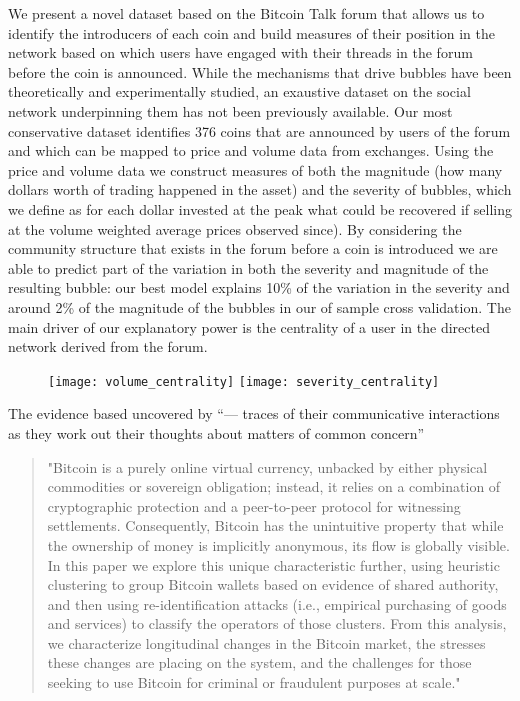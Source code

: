 We present a novel dataset based on the Bitcoin Talk forum that allows us to identify the introducers of each coin and build measures of their position in the network based on which users have engaged with their threads in the forum before the coin is announced.
While the mechanisms that drive bubbles have been theoretically  \cite{abolafia1988enacting, earl2007decision, bakker2010social, harras2011grow} and experimentally \cite{moinas2013bubble} studied, an exaustive dataset on the social network underpinning them has not been previously available.
Our most conservative dataset identifies 376 coins that are announced by users of the forum and which can be mapped to price and volume data from exchanges.
Using the price and volume data we construct measures of both  the magnitude (how many dollars worth of trading happened in the asset) and the severity of bubbles, which we define as for each dollar invested at the peak what could be recovered if selling at the volume weighted average prices observed since).
By considering the community structure that exists in the forum before a coin is introduced we are able to predict part of the variation in both the severity and magnitude of the resulting bubble: our best model explains 10\% of the variation in the severity and around 2\% of the magnitude of the bubbles in our of sample cross validation. 
The main driver of our explanatory power is the centrality of a user in the directed network derived from the forum.
\begin{figure}[b]
\texttt{[image: volume\_centrality]}
\texttt{[image: severity\_centrality]}
\end{figure}

The evidence based uncovered by “— traces of their communicative interactions as they work out their thoughts about matters of common concern” 

\begin{quote}
"Bitcoin is a purely online virtual currency, unbacked by either physical commodities or sovereign obligation; instead, it relies on a combination of cryptographic protection and a peer-to-peer protocol for witnessing settlements. Consequently, Bitcoin has the unintuitive property that while the ownership of money is implicitly anonymous, its flow is globally visible. In this paper we explore this unique characteristic further, using heuristic clustering to group Bitcoin wallets based on evidence of shared authority, and then using re-identification attacks (i.e., empirical purchasing of goods and services) to classify the operators of those clusters. From this analysis, we characterize longitudinal changes in the Bitcoin market, the stresses these changes are placing on the system, and the challenges for those seeking to use Bitcoin for criminal or fraudulent purposes at scale." 
\end{quote} 
\cite{meiklejohn2013fistful}

